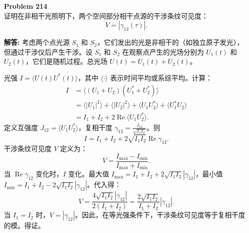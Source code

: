 \documentclass[12pt, a4paper, oneside]{ctexart}
\newenvironment{solution}{\par\noindent\textbf{解答:}\quad}{\par}
\begin{document}
\begin{mdframed}[backgroundcolor=gray!10, linewidth=0pt]
    \textbf{Problem 214} \\
    证明在非相干光照明下，两个空间部分相干点源的干涉条纹可见度：
    \[
    V = |\gamma_{12}(\tau)|.
    \]
\end{mdframed}
\begin{solution}
    考虑两个点光源 $S_1$ 和 $S_2$，它们发出的光是非相干的（如独立原子发光），但通过干涉仪后产生干涉。设 $S_1$ 和 $S_2$ 在观察点产生的光场分别为 $U_1(t)$ 和 $U_2(t)$，它们是随机过程。总光场 $U(t) = U_1(t) + U_2(t)$。

    光强 $I = \langle U(t) U^*(t) \rangle$，其中 $\langle \cdot \rangle$ 表示时间平均或系综平均。计算：
    \begin{align*}
        I &= \langle (U_1+U_2)(U_1^*+U_2^*) \rangle \\
        &= \langle |U_1|^2 \rangle + \langle |U_2|^2 \rangle + \langle U_1 U_2^* \rangle + \langle U_1^* U_2 \rangle \\
        &= I_1 + I_2 + 2 \operatorname{Re} \langle U_1 U_2^* \rangle.
    \end{align*}
    定义互强度 $J_{12} = \langle U_1 U_2^* \rangle$，复相干度 $\gamma_{12} = \frac{J_{12}}{\sqrt{I_1 I_2}}$。则
    \[
    I = I_1 + I_2 + 2 \sqrt{I_1 I_2} \operatorname{Re} \gamma_{12}.
    \]
    干涉条纹可见度 $V$ 定义为：
    \[
    V = \frac{I_{\max} - I_{\min}}{I_{\max} + I_{\min}}.
    \]
    当 $\operatorname{Re} \gamma_{12}$ 变化时，$I$ 变化。最大值 $I_{\max} = I_1 + I_2 + 2\sqrt{I_1 I_2} |\gamma_{12}|$，最小值 $I_{\min} = I_1 + I_2 - 2\sqrt{I_1 I_2} |\gamma_{12}|$。代入得：
    \[
    V = \frac{4\sqrt{I_1 I_2} |\gamma_{12}|}{2(I_1+I_2)} = \frac{2\sqrt{I_1 I_2}}{I_1+I_2} |\gamma_{12}|.
    \]
    当 $I_1 = I_2$ 时，$V = |\gamma_{12}|$。因此，在等光强条件下，干涉条纹可见度等于复相干度的模。得证。
\end{solution}
\end{document}
